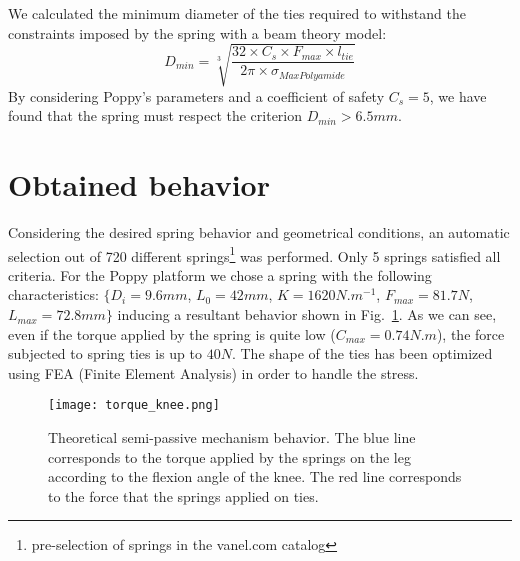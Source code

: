 We calculated the minimum diameter of the ties required to withstand the constraints imposed by the spring with a beam theory model:
\begin{equation}
    D_{min}= \sqrt[3]{ \frac{32 \times  C_s \times F_{max} \times l_{tie}}{2 \pi \times \sigma_{MaxPolyamide}} }
\end{equation}
By considering Poppy's parameters and a coefficient of safety $C_s = 5$, we have found that the spring must respect the criterion $D_{min} > 6.5 mm$.

\section{Obtained behavior} %
\label{sub:obtained_behavior}

Considering the desired spring behavior and geometrical conditions, an automatic selection out of 720 different springs\footnote{pre-selection of springs in the vanel.com catalog} was performed. Only 5 springs satisfied all criteria. For the Poppy platform we chose a spring with the following characteristics: $\{ D_i=9.6mm$, $L_0=42mm$, $K=1620N.m^{-1}$, $F_{max}=81.7 N$, $L_{max}=72.8 mm \}$ inducing a resultant behavior shown in Fig.~\ref{fig:knee_feature}. As we can see, even if the torque applied by the spring is quite low ($C_{max} = 0.74 N.m$), the force subjected to spring ties is up to $40N$. The shape of the ties has been optimized using FEA (Finite Element Analysis) in order to handle the stress.

\begin{figure}[ht]
    \centering
    \texttt{[image: torque\_knee.png]}
    \caption{Theoretical semi-passive mechanism behavior. The blue line corresponds to the torque applied by the springs on the leg according to the flexion angle of the knee. The red line corresponds to the force that the springs applied on ties.}
    \label{fig:knee_feature}
\end{figure}

